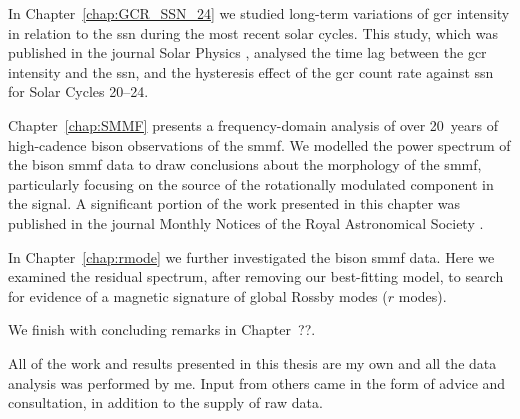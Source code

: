 In Chapter~\ref{chap:GCR_SSN_24} we studied long-term variations of \gls{gcr} intensity in relation to the \gls{ssn} during the most recent solar cycles. This study, which was published in the journal Solar Physics \citep{ross_behaviour_2019}, analysed the time lag between the \gls{gcr} intensity and the \gls{ssn}, and the hysteresis effect of the \gls{gcr} count rate against \gls{ssn} for Solar Cycles 20--24.

Chapter~\ref{chap:SMMF} presents a frequency-domain analysis of over 20~years of high-cadence \gls{bison} observations of the \gls{smmf}. We modelled the power spectrum of the \gls{bison} \gls{smmf} data to draw conclusions about the morphology of the \gls{smmf}, particularly focusing on the source of the rotationally modulated component in the signal. A significant portion of the work presented in this chapter was published in the journal Monthly Notices of the Royal Astronomical Society \citep{ross_lifetimes_2021}.

In Chapter~\ref{chap:rmode} we further investigated the \gls{bison} \gls{smmf} data. Here we examined the residual spectrum, after removing our best-fitting model, to search for evidence of a magnetic signature of global Rossby modes ($r$ modes). %

We finish with concluding remarks in Chapter~??.

All of the work and results presented in this thesis are my own and all the data analysis was performed by me. Input from others came in the form of advice and consultation, in addition to the supply of raw data.
